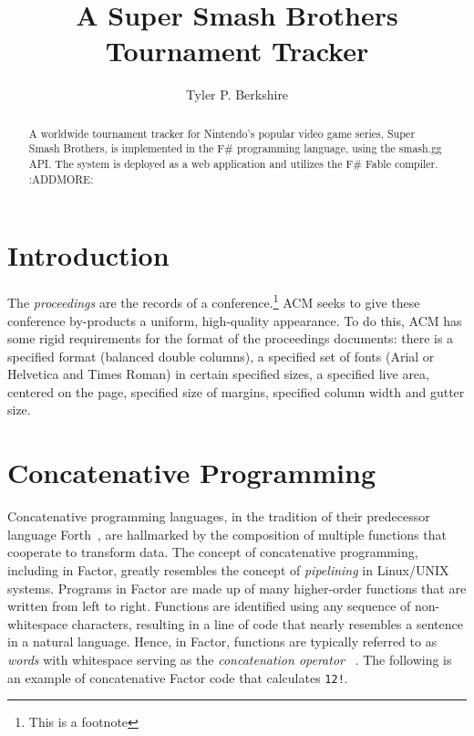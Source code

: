 \documentclass[sigconf]{acmart}
\begin{document}
\title{A Super Smash Brothers Tournament Tracker}
\author{Tyler P. Berkshire}

\renewcommand{\shortauthors}{T.P. Berkshire}

\begin{abstract}
A worldwide tournament tracker for Nintendo's popular video game series, Super Smash Brothers, is implemented in the F\# programming language, using the smash.gg API. The system is deployed as a web application and utilizes the F\# Fable compiler. :ADDMORE:
\end{abstract}


\maketitle

\section{Introduction}

The \textit{proceedings} are the records of a conference.\footnote{This
  is a footnote}  ACM seeks
to give these conference by-products a uniform, high-quality
appearance.  To do this, ACM has some rigid requirements for the
format of the proceedings documents: there is a specified format
(balanced double columns), a specified set of fonts (Arial or
Helvetica and Times Roman) in certain specified sizes, a specified
live area, centered on the page, specified size of margins, specified
column width and gutter size.

\section{Concatenative Programming}

Concatenative programming languages, in the tradition of their
predecessor language Forth~\cite{koopman:forth}, are hallmarked
by the composition of multiple functions that cooperate to
transform data. The concept of concatenative programming,
including in Factor, greatly resembles the concept of 
\textit{pipelining} in Linux/UNIX systems. Programs in Factor 
are made up of many higher-order functions that are written 
from left to right. Functions are identified using any sequence 
of non-whitespace characters, resulting in a line of code that 
nearly resembles a sentence in a natural language. Hence, in 
Factor, functions are typically referred to as \textit{words} 
with whitespace serving as the \textit{concatenation operator}
~\cite{pestov:Factor}. The following is an example of 
concatenative Factor code that calculates \texttt{12!}.
\end{document}
